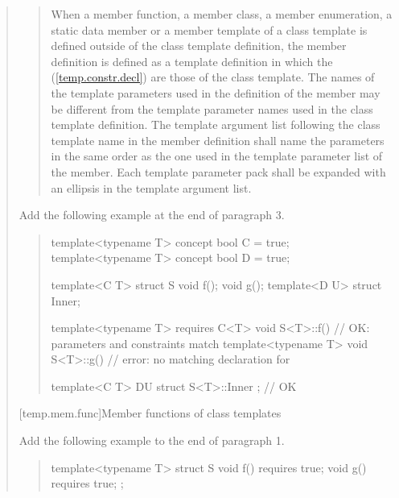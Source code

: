 \begin{quote}
\begin{quote}
\setcounter{Paras}{2}
\pnum
When a member function, a member class, a member enumeration, a static 
data member or a member template of a class template is defined outside 
of the class template definition, the member definition is defined as a 
template definition in which the 
 (\ref{temp.constr.decl}) are those of 
the class template.
% 
The names of the template parameters used in the definition of the 
member may be different from the template parameter names used in the 
class template definition. The template argument list following the class
template name in the member definition shall name the parameters in the 
same order as the one used in the template parameter list of the member. 
% 
Each template parameter pack shall be expanded with an ellipsis in the 
template argument list.
\end{quote}

Add the following example at the end of paragraph 3.

\begin{quote}
\begin{addedblock}
\enterexample
\begin{codeblock}
template<typename T> concept bool C = true;
template<typename T> concept bool D = true;

template<C T> struct S {
    void f();
    void g();
    template<D U> struct Inner;
  }

template<typename T> requires C<T> void S<T>::f() { } // OK: parameters and constraints match
template<typename T> void S<T>::g() { } // error: no matching declaration for 

template<C T> D{U} struct S<T>::Inner { }; // OK
\end{codeblock}
\exitexample
\end{addedblock}
\end{quote}

[temp.mem.func]{Member functions of class templates}

Add the following example to the end of paragraph 1.

\begin{quote}
\begin{addedblock}
\enterexample
\begin{codeblock}
template<typename T> struct S {
  void f() requires true;
  void g() requires true;
};


\end{codeblock}
\end{addedblock}
\end{quote}
\end{quote}

